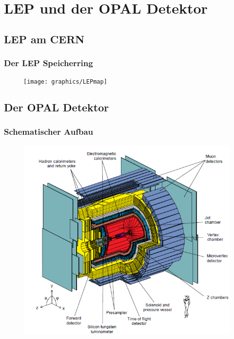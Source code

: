 \section{LEP und der OPAL Detektor}
\subsection{LEP am CERN}
\begin{frame}
	\frametitle{Der LEP Speicherring}
	\begin{figure}
		\texttt{[image: graphics/LEPmap]}
	\end{figure}
\end{frame}

\subsection{Der OPAL Detektor}
\begin{frame}
	\frametitle{Schematischer Aufbau}
	\begin{center}
	\begin{figure}
		\includegraphics[width=0.7\linewidth]{graphics/OPALaufbau}
	\end{figure}
	\end{center}
\end{frame}

